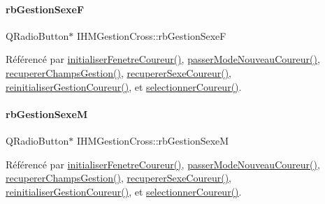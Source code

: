 \mbox{\label{class_i_h_m_gestion_cross_a4474ef47310eb3511befdf1beaa18b56}} 
\paragraph{\texorpdfstring{rb\+Gestion\+SexeF}{rbGestionSexeF}}
{\footnotesize\ttfamily Q\+Radio\+Button$\ast$ I\+H\+M\+Gestion\+Cross\+::rb\+Gestion\+SexeF\hspace{0.3cm}{\ttfamily [private]}}



Référencé par \hyperlink{class_i_h_m_gestion_cross_aa5d9de499a66e52b843c4ef4c6074a60}{initialiser\+Fenetre\+Coureur()}, \hyperlink{class_i_h_m_gestion_cross_ac8f336c95a5f0c9eb8a4bc1c4bb83445}{passer\+Mode\+Nouveau\+Coureur()}, \hyperlink{class_i_h_m_gestion_cross_a271efe8d31fbe05fccfb2dc81e71971a}{recuperer\+Champs\+Gestion()}, \hyperlink{class_i_h_m_gestion_cross_a7e1cdc8b3b01f2f2f666f80bf1cc9f5a}{recuperer\+Sexe\+Coureur()}, \hyperlink{class_i_h_m_gestion_cross_a85c44933ec0dcbb591e01c832063367e}{reinitialiser\+Gestion\+Coureur()}, et \hyperlink{class_i_h_m_gestion_cross_ad71963d500fd61995fdae94e833db163}{selectionner\+Coureur()}.

\mbox{\label{class_i_h_m_gestion_cross_a7d471a7f96862dcd302f7f8cc52dfea4}} 
\paragraph{\texorpdfstring{rb\+Gestion\+SexeM}{rbGestionSexeM}}
{\footnotesize\ttfamily Q\+Radio\+Button$\ast$ I\+H\+M\+Gestion\+Cross\+::rb\+Gestion\+SexeM\hspace{0.3cm}{\ttfamily [private]}}



Référencé par \hyperlink{class_i_h_m_gestion_cross_aa5d9de499a66e52b843c4ef4c6074a60}{initialiser\+Fenetre\+Coureur()}, \hyperlink{class_i_h_m_gestion_cross_ac8f336c95a5f0c9eb8a4bc1c4bb83445}{passer\+Mode\+Nouveau\+Coureur()}, \hyperlink{class_i_h_m_gestion_cross_a271efe8d31fbe05fccfb2dc81e71971a}{recuperer\+Champs\+Gestion()}, \hyperlink{class_i_h_m_gestion_cross_a7e1cdc8b3b01f2f2f666f80bf1cc9f5a}{recuperer\+Sexe\+Coureur()}, \hyperlink{class_i_h_m_gestion_cross_a85c44933ec0dcbb591e01c832063367e}{reinitialiser\+Gestion\+Coureur()}, et \hyperlink{class_i_h_m_gestion_cross_ad71963d500fd61995fdae94e833db163}{selectionner\+Coureur()}.

